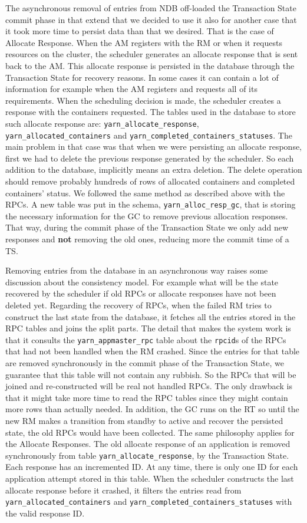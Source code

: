 The asynchronous removal of entries from NDB off-loaded the Transaction
State commit phase in that extend that we decided to use it also for
another case that it took more time to persist data than that we
desired. That is the case of Allocate Response. When the AM registers
with the RM or when it requests resources on the cluster, the
scheduler generates an allocate response that is sent back to the
AM. This allocate response is persisted in the database through the
Transaction State for recovery reasons. In some cases it can contain a
lot of information for example when the AM registers and requests all
of its requirements. When the scheduling decision is made, the scheduler creates a response with the
containers requested. The tables used in the database to store such
allocate response are: \texttt{yarn\_allocate\_response},
\texttt{yarn\_allocated\_containers} and
\texttt{yarn\_completed\_containers\_statuses}. The main problem in
that case was that when we were persisting an allocate response, first we
had to delete the previous response generated by the
scheduler. So each addition to the database, implicitly means an extra
deletion. The delete operation should remove probably hundreds of
rows of allocated containers and completed containers' status. We
followed the same method as described above with the RPCs. A new table
was put in the schema, \texttt{yarn\_alloc\_resp\_gc}, that is
storing the necessary information for the GC to remove previous
allocation responses. That way, during the commit phase of the
Transaction State we only add new responses and \textbf{not} removing
the old ones, reducing more the commit time of a TS.

Removing entries from the database in an asynchronous way raises some
discussion about the consistency model. For example what will be the
state recovered by the scheduler if old RPCs or allocate responses
have not been deleted yet. Regarding the recovery of RPCs, when the
failed RM tries to construct the last state from the database, it
fetches all the entries stored in the RPC tables and joins the split
parts. The detail that makes the system work is that it consults the
\texttt{yarn\_appmaster\_rpc} table about the \texttt{rpcid}s of the
RPCs that had not been handled when the RM crashed. Since the entries
for that table are removed synchronously in the commit phase of the
Transaction State, we guarantee that this table will not contain any
rubbish. So the RPCs that will be joined and re-constructed will be
real not handled RPCs. The only drawback is that it might take more
time to read the RPC tables since they might contain more rows than
actually needed. In addition, the GC runs on the RT so until the new
RM makes a transition from standby to active and recover the persisted
state, the old RPCs would have been collected. The same philosophy
applies for the Allocate Responses. The old allocate response of an
application is removed synchronously from table
\texttt{yarn\_allocate\_response}, by the Transaction State. Each
response has an incremented ID. At any time, there is only one ID for
each application attempt stored in this table. When the scheduler
constructs the last allocate response before it crashed, it filters
the entries read from \texttt{yarn\_allocated\_containers} and
\texttt{yarn\_completed\_containers\_statuses} with the valid response ID.